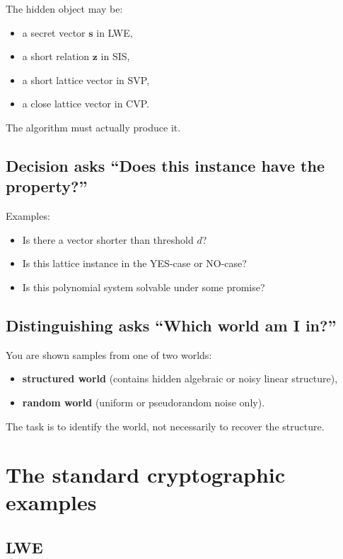 \documentclass[11pt]{article}
\begin{document}
	The hidden object may be:
	\begin{itemize}
		\item a secret vector $\bm s$ in LWE,
		\item a short relation $\bm z$ in SIS,
		\item a short lattice vector in SVP,
		\item a close lattice vector in CVP.
	\end{itemize}
	
	\noindent
	The algorithm must actually produce it.
	
	\subsection{Decision asks ``Does this instance have the property?''}
	
	Examples:
	\begin{itemize}
		\item Is there a vector shorter than threshold $d$?
		\item Is this lattice instance in the YES-case or NO-case?
		\item Is this polynomial system solvable under some promise?
	\end{itemize}
	
	\subsection{Distinguishing asks ``Which world am I in?''}
	
	You are shown samples from one of two worlds:
	\begin{itemize}
		\item \textbf{structured world} (contains hidden algebraic or noisy linear structure),
		\item \textbf{random world} (uniform or pseudorandom noise only).
	\end{itemize}
	
	\noindent
	The task is to identify the world, not necessarily to recover the structure.
	
	\section{The standard cryptographic examples}
	
	\subsection{LWE}
	
\end{document}
